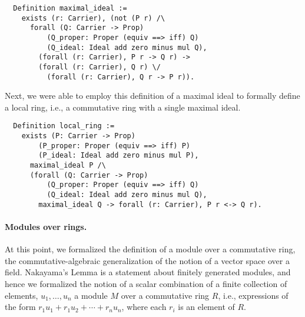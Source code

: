 \documentclass{article}
\begin{document}
\begin{verbatim}
  Definition maximal_ideal :=
    exists (r: Carrier), (not (P r) /\
      forall (Q: Carrier -> Prop)
          (Q_proper: Proper (equiv ==> iff) Q)
          (Q_ideal: Ideal add zero minus mul Q),
        (forall (r: Carrier), P r -> Q r) ->
        (forall (r: Carrier), Q r) \/
          (forall (r: Carrier), Q r -> P r)).
\end{verbatim}

\noindent Next, we were able to employ this definition of a maximal ideal
to formally define a local
ring, i.e., a commutative ring with a single maximal ideal.
 
\begin{verbatim}
  Definition local_ring :=
    exists (P: Carrier -> Prop)
        (P_proper: Proper (equiv ==> iff) P)
        (P_ideal: Ideal add zero minus mul P),
      maximal_ideal P /\
      (forall (Q: Carrier -> Prop)
          (Q_proper: Proper (equiv ==> iff) Q)
          (Q_ideal: Ideal add zero minus mul Q),
        maximal_ideal Q -> forall (r: Carrier), P r <-> Q r).
\end{verbatim}



\paragraph{Modules over rings.}
At this point, we formalized the definition of a module over a commutative ring,
the commutative-algebraic generalization of the notion of a vector space over a
field. Nakayama's Lemma is a statement about finitely generated modules, and
hence we formalized the notion of a scalar combination of a finite
collection of elements, $u_1, \ldots, u_n$ a module $M$ over a commutative ring $R$, i.e.,
expressions of the form $r_1 u_1 + r_1 u_2 + \cdots + r_n u_n$, where each
$r_i$ is an element of $R$.
\end{document}
